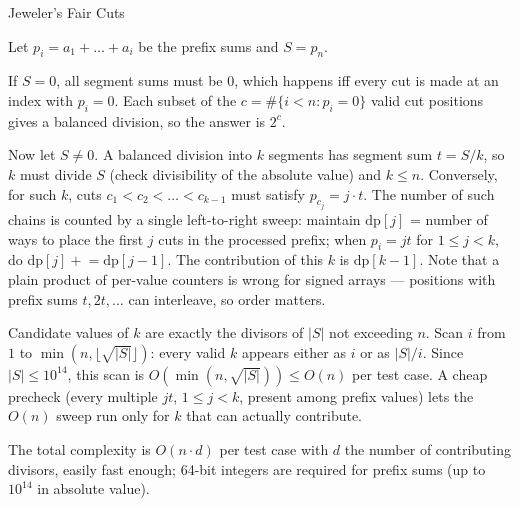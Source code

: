 \begin{tutorial}{Jeweler's Fair Cuts}

Let $p_i = a_1 + \dots + a_i$ be the prefix sums and $S = p_n$.

If $S = 0$, all segment sums must be $0$, which happens iff every cut is made at an index with $p_i = 0$. Each subset of the $c = \#\{i < n : p_i = 0\}$ valid cut positions gives a balanced division, so the answer is $2^c$.

Now let $S \neq 0$. A balanced division into $k$ segments has segment sum $t = S / k$, so $k$ must divide $S$ (check divisibility of the absolute value) and $k \le n$. Conversely, for such $k$, cuts $c_1 < c_2 < \dots < c_{k-1}$ must satisfy $p_{c_j} = j \cdot t$. The number of such chains is counted by a single left-to-right sweep: maintain $\text{dp}[j]$ = number of ways to place the first $j$ cuts in the processed prefix; when $p_i = j t$ for $1 \le j < k$, do $\text{dp}[j] \mathrel{+}= \text{dp}[j-1]$. The contribution of this $k$ is $\text{dp}[k-1]$. Note that a plain product of per-value counters is wrong for signed arrays --- positions with prefix sums $t, 2t, \ldots$ can interleave, so order matters.

Candidate values of $k$ are exactly the divisors of $|S|$ not exceeding $n$. Scan $i$ from $1$ to $\min(n, \lfloor\sqrt{|S|}\rfloor)$: every valid $k$ appears either as $i$ or as $|S|/i$. Since $|S| \le 10^{14}$, this scan is $O(\min(n, \sqrt{|S|})) \le O(n)$ per test case. A cheap precheck (every multiple $j t$, $1 \le j < k$, present among prefix values) lets the $O(n)$ sweep run only for $k$ that can actually contribute.

The total complexity is $O(n \cdot d)$ per test case with $d$ the number of contributing divisors, easily fast enough; 64-bit integers are required for prefix sums (up to $10^{14}$ in absolute value).


\end{tutorial}
